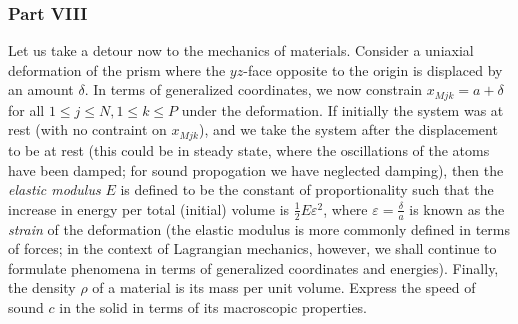 \documentclass[letterpaper,12pt]{article}
\begin{document}
\begin{flushleft}
    \subsubsection*{Part VIII}
    Let us take a detour now to the mechanics of materials. Consider a uniaxial deformation of the prism where the $yz$-face opposite to the origin is displaced by an amount $\delta$. In terms of generalized coordinates, we now constrain $x_{Mjk} = a + \delta$ for all $1 \leq j \leq N, 1 \leq k \leq P$ under the deformation. If initially the system was at rest (with no contraint on $x_{Mjk}$), and we take the system after the displacement to be at rest (this could be in steady state, where the oscillations of the atoms have been damped; for sound propogation we have neglected damping), then the \textit{elastic modulus} $E$ is defined to be the constant of proportionality such that the increase in energy per total (initial) volume is $\frac{1}{2}E\varepsilon^2$, where $\varepsilon = \frac{\delta}{a}$ is known as the \textit{strain} of the deformation (the elastic modulus is more commonly defined in terms of forces; in the context of Lagrangian mechanics, however, we shall continue to formulate phenomena in terms of generalized coordinates and energies). Finally, the density $\rho$ of a material is its mass per unit volume.\newline\newline
    Express the speed of sound $c$ in the solid in terms of its macroscopic properties.

\end{flushleft}
\end{document}
